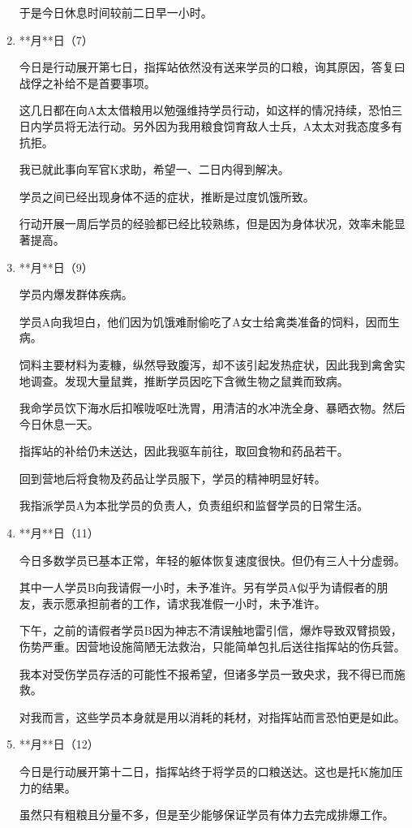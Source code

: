 \begin{enumerate}
于是今日休息时间较前二日早一小时。
    \item **月**日（7）
    
今日是行动展开第七日，指挥站依然没有送来学员的口粮，询其原因，答复曰战俘之补给不是首要事项。

这几日都在向A太太借粮用以勉强维持学员行动，如这样的情况持续，恐怕三日内学员将无法行动。另外因为我用粮食饲育敌人士兵，A太太对我态度多有抗拒。

我已就此事向军官K求助，希望一、二日内得到解决。

学员之间已经出现身体不适的症状，推断是过度饥饿所致。

行动开展一周后学员的经验都已经比较熟练，但是因为身体状况，效率未能显著提高。
    \item **月**日（9）
    
学员内爆发群体疾病。

学员A向我坦白，他们因为饥饿难耐偷吃了A女士给禽类准备的饲料，因而生病。

饲料主要材料为麦糠，纵然导致腹泻，却不该引起发热症状，因此我到禽舍实地调查。发现大量鼠粪，推断学员因吃下含微生物之鼠粪而致病。

我命学员饮下海水后扣喉咙呕吐洗胃，用清洁的水冲洗全身、暴晒衣物。然后今日休息一天。

指挥站的补给仍未送达，因此我驱车前往，取回食物和药品若干。

回到营地后将食物及药品让学员服下，学员的精神明显好转。

我指派学员A为本批学员的负责人，负责组织和监督学员的日常生活。
    \item **月**日（11）
    
今日多数学员已基本正常，年轻的躯体恢复速度很快。但仍有三人十分虚弱。

其中一人学员B向我请假一小时，未予准许。另有学员A似乎为请假者的朋友，表示愿承担前者的工作，请求我准假一小时，未予准许。

下午，之前的请假者学员B因为神志不清误触地雷引信，爆炸导致双臂损毁，伤势严重。因营地设施简陋无法救治，只能简单包扎后送往指挥站的伤兵营。

我本对受伤学员存活的可能性不报希望，但诸多学员一致央求，我不得已而施救。

对我而言，这些学员本身就是用以消耗的耗材，对指挥站而言恐怕更是如此。
    \item **月**日（12）
    
今日是行动展开第十二日，指挥站终于将学员的口粮送达。这也是托K施加压力的结果。

虽然只有粗粮且分量不多，但是至少能够保证学员有体力去完成排爆工作。


\end{enumerate}
